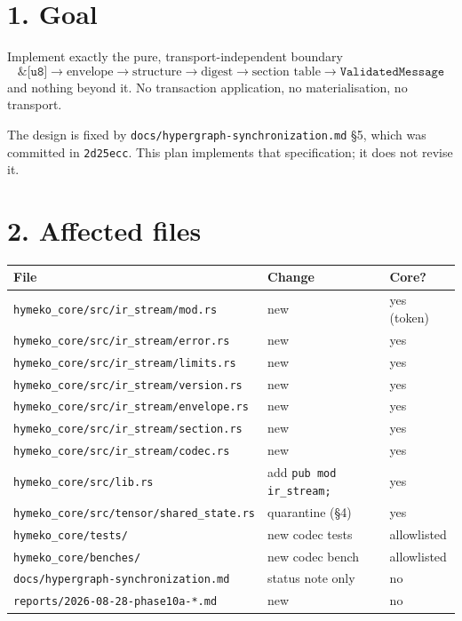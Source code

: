 \documentclass[11pt,a4paper]{article}
\begin{document}
\section*{1. Goal}

Implement exactly the pure, transport-independent boundary
\[
\texttt{\&[u8]} \rightarrow \text{envelope} \rightarrow \text{structure}
\rightarrow \text{digest} \rightarrow \text{section table} \rightarrow
\texttt{ValidatedMessage}
\]
and nothing beyond it. No transaction application, no materialisation, no
transport.

The design is fixed by \texttt{docs/hypergraph-synchronization.md} \S5, which
was committed in \texttt{2d25ecc}. This plan implements that specification; it
does not revise it.

\section*{2. Affected files}

\begin{longtable}{@{}lll@{}}
\toprule
File & Change & Core? \\
\midrule
\texttt{hymeko\_core/src/ir\_stream/mod.rs} & new & yes (token) \\
\texttt{hymeko\_core/src/ir\_stream/error.rs} & new & yes \\
\texttt{hymeko\_core/src/ir\_stream/limits.rs} & new & yes \\
\texttt{hymeko\_core/src/ir\_stream/version.rs} & new & yes \\
\texttt{hymeko\_core/src/ir\_stream/envelope.rs} & new & yes \\
\texttt{hymeko\_core/src/ir\_stream/section.rs} & new & yes \\
\texttt{hymeko\_core/src/ir\_stream/codec.rs} & new & yes \\
\texttt{hymeko\_core/src/lib.rs} & add \texttt{pub mod ir\_stream;} & yes \\
\texttt{hymeko\_core/src/tensor/shared\_state.rs} & quarantine (\S4) & yes \\
\texttt{hymeko\_core/tests/} & new codec tests & allowlisted \\
\texttt{hymeko\_core/benches/} & new codec bench & allowlisted \\
\texttt{docs/hypergraph-synchronization.md} & status note only & no \\
\texttt{reports/2026-08-28-phase10a-*.md} & new & no \\
\bottomrule
\end{longtable}
\end{document}
